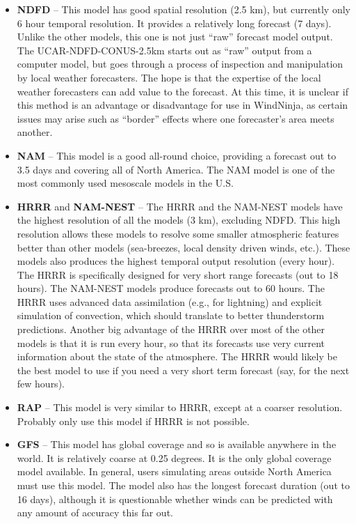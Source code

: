 \documentclass[12pt]{article}
\begin{document}
\begin{itemize}
\item \textbf{NDFD} – This model has good spatial resolution (2.5 km), but currently only 6 hour temporal resolution.  It provides a relatively long forecast (7 days).  Unlike the other models, this one is not just “raw” forecast model output.  The UCAR-NDFD-CONUS-2.5km starts out as “raw” output from a computer model, but goes through a process of inspection and manipulation by local weather forecasters.  The hope is that the expertise of the local weather forecasters can add value to the forecast.  At this time, it is unclear if this method is an advantage or disadvantage for use in WindNinja, as certain issues may arise such as “border” effects where one forecaster's area meets another.

\item \textbf{NAM} – This model is a good all-round choice, providing a forecast out to 3.5 days and covering all of North America.  The NAM model is one of the most commonly used mesoscale models in the U.S.

\item \textbf{HRRR} and \textbf{NAM-NEST} – The HRRR and the NAM-NEST models have the highest resolution of all the models (3 km), excluding NDFD. This high resolution allows these models to resolve some smaller atmospheric features better than other models (sea-breezes, local density driven winds, etc.). These models also produces the highest temporal output resolution (every hour). The HRRR is specifically designed for very short range forecasts (out to 18 hours). The NAM-NEST models produce forecasts out to 60 hours. The HRRR uses advanced data assimilation (e.g., for lightning) and explicit simulation of convection, which should translate to better thunderstorm predictions. Another big advantage of the HRRR over most of the other models is that it is run every hour, so that its forecasts use very current information about the state of the atmosphere.  The HRRR would likely be the best model to use if you need a very short term forecast (say, for the next few hours).

\item \textbf{RAP} – This model is very similar to HRRR, except at a coarser resolution.  Probably only use this model if HRRR is not possible.

\item \textbf{GFS} – This model has global coverage and so is available anywhere in the world.  It is relatively coarse at 0.25 degrees.  It is the only global coverage model available.  In general, users simulating areas outside North America must use this model.  The model also has the longest forecast duration (out to 16 days), although it is questionable whether winds can be predicted with any amount of accuracy this far out.
\end{itemize}
\end{document}
